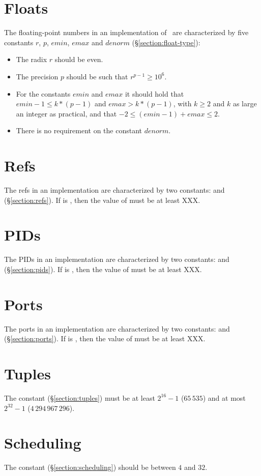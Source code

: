 \section*{Floats}

The floating-point numbers in an implementation of \StdErlang\ are characterized by
five constants $r$, $p$, $\mathit{emin}$, $\mathit{emax}$ and $\mathit{denorm}$
(\S\ref{section:float-type}):
\begin{itemize}
\item The radix $r$ should be even.
\item The precision $p$ should be such that $r^{p-1}\geq 10^6$.
\item For the constants $\mathit{emin}$ and $\mathit{emax}$ it should hold that
$\mathit{emin}-1 \leq k*(p-1)$ and  $\mathit{emax} > k*(p-1)$,
with $k\geq 2$ and $k$ as large an integer as practical, and that
$-2 \leq (emin-1) + emax \leq 2$.
\item There is no requirement on the constant $\mathit{denorm}$.
\end{itemize}

\section*{Refs}

The refs in an implementation are characterized by two constants:
 and  (\S\ref{section:refs}).
If  is ,
then the value of  must be at least XXX.

\section*{PIDs}

The PIDs in an implementation are characterized by two constants:
 and  (\S\ref{section:pids}).
If  is ,
then the value of  must be at least XXX.

\section*{Ports}

The ports in an implementation are characterized by two constants:
 and  (\S\ref{section:ports}).
If  is ,
then the value of  must be at least XXX.

\section*{Tuples}

The constant  (\S\ref{section:tuples})
must be at least $2^{16}-1$ ($65\,535$) and at most
$2^{32}-1$ ($4\,294\,967\,296$).

\section*{Scheduling}

The constant  (\S\ref{section:scheduling})
should be between $4$ and $32$.

